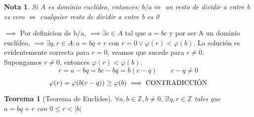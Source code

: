 \documentclass[11pt, a4paper, titlepage]{article}
\makeatletter
\renewenvironment{proof}[1][\proofname] {\vspace{-15pt}\par\pushQED{\qed}\normalfont\topsep6\p@\@plus6\p@\relax\trivlist\item[\hskip\labelsep\it#1\@addpunct{.}]\ignorespaces}{\popQED\endtrivlist\@endpefalse}
\providecommand{\ent}{\mathbb{Z}}
\theoremstyle{theorem-style}
\newtheorem*{nth}{Teorema}
\theoremstyle{definition-style}
\theoremstyle{remark-style}
\newtheorem*{nota}{Nota}
\theoremstyle{example-style}
\makeatother
\begin{document}
\begin{nota}
	Si A es dominio euclídeo, entonces: 
$b/a \iff$ un resto de dividir a entre b es cero $\iff$ cualquier resto de dividir a entre b es 0 
\end{nota}
\begin{proof}
	$\boxed{\implies}$ Por definicion de b/a, $\implies \exists c \in A$ tal que $a=bc$ y por ser A un dominio euclídeo, $\implies \exists q,r \in 		A : 	a = bq + r $ con $r=0 \vee \varphi(r) < \varphi(b)$. La solución 	es evidentemente correcta para $r = 0$, veamos que sucede para $r \neq 	0$.
\\
Supongamos $r \neq 0$, entonces $\varphi(r) < \varphi(b)$. 
$$r = a - bq = bc - bq = b(c-q) \quad \quad c-q \neq 0$$
$$\varphi(r) = \varphi(b(c-q)) \ge \varphi(b) \implies \textup{CONTRADICCIÓN}$$  
\end{proof}

\begin{nth}[Teorema de Euclídes]

	$\forall a,b \in \ent, b \neq 0, \exists !q,r \in \ent$ tales que $a = bq + r $ con $0 \le r < |b|$
\end{nth}
\end{document}
